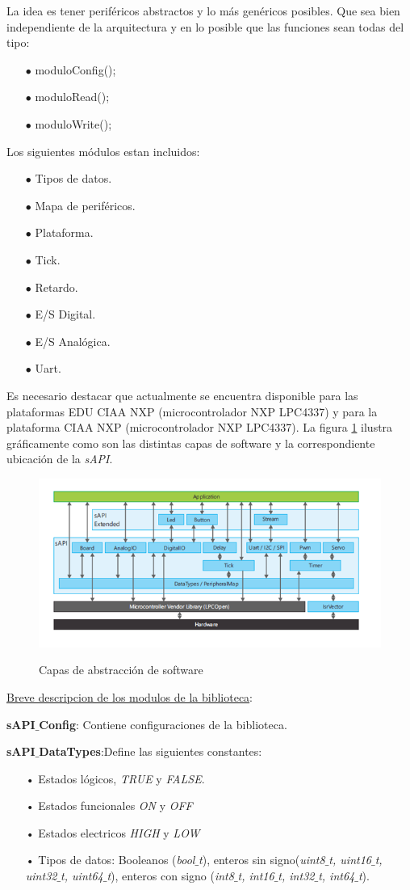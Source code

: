 \documentclass[12pt,letterpaper]{article}
\begin{document}
La idea es tener periféricos abstractos y lo más genéricos posibles. Que sea bien independiente de la arquitectura y en lo posible que las funciones sean todas del tipo:
\begin{enumerate}
\item[$\bullet$]	moduloConfig();
\item[$\bullet$]  moduloRead();
\item[$\bullet$]  moduloWrite();
\end{enumerate}
Los siguientes módulos estan incluidos:
\begin{enumerate}
\item[$\bullet$]Tipos de datos.
\item[$\bullet$]Mapa de periféricos.
\item[$\bullet$]Plataforma.
\item[$\bullet$]Tick.
\item[$\bullet$]Retardo.
\item[$\bullet$]E/S Digital.
\item[$\bullet$]E/S Analógica.
\item[$\bullet$]Uart.
\end{enumerate}
 Es necesario destacar que actualmente se encuentra disponible para las plataformas EDU CIAA NXP (microcontrolador NXP LPC4337) y para la plataforma CIAA NXP (microcontrolador NXP LPC4337). La figura \ref{Fig18} ilustra gráficamente como son las distintas capas de software y la correspondiente ubicación de la \textit{sAPI}.
\begin{center}
\begin{figure}[!h]
\centering
\includegraphics[width=8 cm]{figuras/primer_proy18.png}\\
\caption{Capas de abstracción de software}
\label{Fig18}
\end{figure}
\end{center} 
\underline{Breve descripcion de los modulos de la biblioteca}:

\textbf{sAPI$\_$Config}: Contiene configuraciones de la biblioteca.

\textbf{sAPI$\_$DataTypes}:Define las siguientes constantes:
\begin{enumerate}
\item[•]Estados lógicos, \textit{TRUE} y \textit{FALSE}.
\item[•]Estados funcionales \textit{ON} y \textit{OFF}
\item[•]Estados electricos \textit{HIGH} y \textit{LOW}
\item[•]Tipos de datos: Booleanos (\textit{bool$\_$t}), enteros sin signo(\textit{uint8$\_$t, uint16$\_$t, uint32$\_$t, uint64$\_$t}), enteros con signo (\textit{int8$\_$t, int16$\_$t, int32$\_$t, int64$\_$t}).
\end{enumerate}
\end{document}
